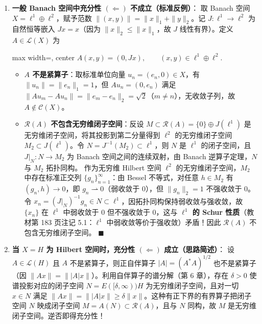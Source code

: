 \documentclass[11pt,a4paper]{article}
\providecommand{\tightlist}{\setlength{\itemsep}{2pt}\setlength{\parskip}{0pt}}
\newcommand{\FitDisplayMath}[1]{%
  \par\vspace{4.5pt}\noindent
  \begin{adjustbox}{max width=\linewidth, center}
    $\displaystyle #1$
  \end{adjustbox}
  \par\vspace{4.5pt}%
}
\begin{document}
\begin{enumerate}
\def\labelenumi{\arabic{enumi}.}
\tightlist
\item
  \textbf{一般 Banach 空间中充分性 \((\Leftarrow)\) 不成立（标准反例）}： 取 Banach 空间 \(X = \ell^1 \oplus \ell^2\)，赋予范数 \(\|(x, y)\| = \|x\|_1 + \|y\|_2\)。记 \(J: \ell^1 \to \ell^2\) 为自然恒等嵌入 \(Jx = x\)（因为 \(\|x\|_2 \le \|x\|_1\)，故 \(J\) 线性有界）。定义 \(A \in \mathcal{L}(X)\) 为 
\FitDisplayMath{A(x, y) = (0, Jx), \qquad (x, y) \in \ell^1 \oplus \ell^2.}


  \begin{itemize}
  \tightlist
  \item
    \textbf{\(A\) 不是紧算子}：取标准单位向量 \(u_n = (e_n, 0) \in X\)，有 \(\|u_n\| = \|e_n\|_1 = 1\)，但 \(Au_n = (0, e_n)\) 满足 \(\|Au_m - Au_n\| = \|e_m - e_n\|_2 = \sqrt{2}\)（\(m \neq n\)），无收敛子列，故 \(A \notin \mathcal{C}(X)\)。
  \item
    \textbf{\(\mathcal{R}(A)\) 不包含无穷维闭子空间}：反设 \(M \subset \mathcal{R}(A) = \{0\} \oplus J(\ell^1)\) 是无穷维闭子空间，将其投影到第二分量得到 \(\ell^2\) 的无穷维闭子空间 \(M_2 \subset J(\ell^1)\)。令 \(N = J^{-1}(M_2) \subset \ell^1\)，则 \(N\) 是 \(\ell^1\) 的闭子空间，且 \(J|_N: N \to M_2\) 为 Banach 空间之间的连续双射，由 Banach 逆算子定理，\(N\) 与 \(M_2\) 拓扑同构。 作为无穷维 Hilbert 空间 \(\ell^2\) 的无穷维闭子空间，\(M_2\) 中存在标准正交列 \(\{g_n\}_{n=1}^\infty\)：由 Bessel 不等式，对任意 \(h \in M_2\) 有 \((g_n, h) \to 0\)，即 \(g_n \rightharpoonup 0\)（弱收敛于 \(0\)），但 \(\|g_n\|_2 = 1\) 不强收敛于 \(0\)。令 \(x_n = (J|_N)^{-1} g_n \in N \subset \ell^1\)，因拓扑同构保持弱收敛与强收敛，故 \(\{x_n\}\) 在 \(\ell^1\) 中弱收敛于 \(0\) 但不强收敛于 \(0\)，这与 \textbf{\(\ell^1\) 的 Schur 性质}（教材第 183 页注记 5.1：\(\ell^1\) 中弱收敛等价于强收敛）矛盾！因此 \(\mathcal{R}(A)\) 不包含无穷维闭子空间。 \(\blacksquare\)
  \end{itemize}
\item
  \textbf{当 \(X = H\) 为 Hilbert 空间时，充分性 \((\Leftarrow)\) 成立（思路简述）}： 设 \(A \in \mathcal{L}(H)\) 且 \(A\) 不是紧算子，则正自伴算子 \(|A| = (A^*A)^{1/2}\) 也不是紧算子（因 \(\|Ax\| = \||A|x\|\)）。利用自伴算子的谱分解（第 6 章），存在 \(\delta > 0\) 使谱投影对应的闭子空间 \(N = E([\delta, \infty))H\) 为无穷维闭子空间，且对一切 \(x \in N\) 满足 \(\|Ax\| = \||A|x\| \ge \delta \|x\|\)。这种有正下界的有界算子把闭子空间 \(N\) 映成闭子空间 \(M = A(N) \subset \mathcal{R}(A)\)，且与 \(N\) 同构，故 \(M\) 是无穷维闭子空间。逆否即得充分性！
\end{enumerate}
\end{document}
